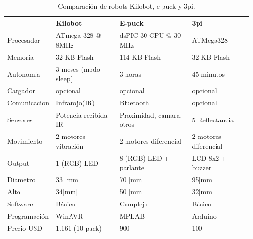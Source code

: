 \begin{table}\small
    \begin{tabular}{l|lll}
    ~                        &    Kilobot                    &    E-puck                                           &    3pi                          \\ \hline
       Procesador            &    ATmega   328 @ 8MHz &    dsPIC 30 CPU @ 30 MHz                &    ATMega328                    \\
       Memoria               &    32 KB   Flash              &    114 KB   Flash                                   &    32 KB   Flash                \\
       Autonomía             &    3 meses   (modo sleep)     &    3 horas                                          &    45   minutos                 \\
       Cargador              &    opcional                   &    opcional                                         &    opcional                     \\
       Comunicacion          &    Infrarojo(IR)              &    Bluetooth                                        &    opcional                     \\
       Sensores              &    Potencia   recibida IR     &    Proximidad,   camara, otros &    5   Reflectancia \\
       Movimiento            &    2 motores   vibración      &    2 motores   diferencial                          &    2 motores   diferencial      \\
       Output                &   1 (RGB) LED                 &    8 (RGB)   LED + parlante                         &    LCD 8x2 + buzzer             \\
       Diametro              &    33 [mm]                    &    70 [mm]                                          &    95[mm]                       \\
       Alto                  &    34[mm]                     &    50 [mm]                                          &    32[mm]                       \\
       Software &    Básico                     &    Complejo                                         &    Básico                       \\
       Programación          &    WinAVR                     &    MPLAB                                            &    Arduino                      \\
       Precio USD            &    1.161 (10 pack)            &    900                                              &    100                          \\
    \end{tabular}
    \label{table:comparacion}
    \caption {Comparación de robots Kilobot, e-puck y 3pi.}
\end{table}


